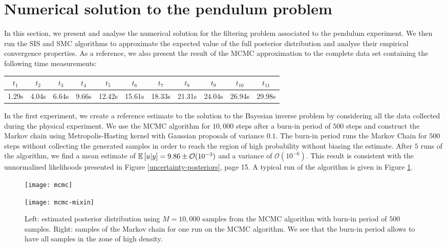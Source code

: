 \section{Numerical solution to the pendulum problem}
In this section, we present and analyse the numerical solution for the filtering problem associated to the pendulum experiment. We then run the SIS and SMC algorithms to approximate the expected value of the full posterior distribution and analyse their empirical convergence properties. As a reference, we also present the result of the MCMC approximation to the complete data set containing the following time measurements:

\begin{table}[h]
  \begin{center}
    \begin{tabular}{|c c c c c c c c c c c|}
      \hline $t_1$ & $t_2$ & $t_3$ & $t_4$ & $t_5$ & $t_6$ & $t_7$ & $t_8$ & $t_9$ & $t_{10}$ & $t_{11}$ \\
      \hline
      1.29s & 4.04s & 6.64s & 9.66s & 12.42s & 15.61s & 18.33s & 21.31s & 24.04s & 26.94s & 29.98s \\
      \hline
    \end{tabular}
  \end{center}
\end{table}

In the first experiment, we create a reference estimate to the solution to the Bayesian inverse problem by considering all the data collected during the physical experiment. We use the MCMC algorithm for $10,000$ steps after a burn-in period of $500$ steps and construct the Markov chain using Metropolis-Hasting kernel with Gaussian proposals of variance $0.1$. The burn-in period runs the Markov Chain for $500$ steps without collecting the generated samples in order to reach the region of high probability without biasing the estimate. After $5$ runs of the algorithm, we find a mean estimate of $\mathbb{E}\left[u|y\right] = 9.86 \pm \mathcal{O}(10^{-3})$ and a variance of $\mathcal{O}(10^{-6})$. This result is consistent with the unnormalized likelihoods presented in Figure \ref{uncertainty-posteriors}, page 15. A typical run of the algorithm is given in Figure \ref{mcmc-figure}.

\begin{figure}[!t]
  \begin{minipage}{.43\textwidth}
    \texttt{[image: mcmc]}
  \end{minipage}
  \begin{minipage}{.5\textwidth}
    \texttt{[image: mcmc-mixin]}
  \end{minipage}
  \caption{Left: estimated posterior distribution using $M=10,000$ samples from the MCMC algorithm with burn-in period of $500$ samples. Right: samples of the Markov chain for one run on the MCMC algorithm. We see that the burn-in period allows to have all samples in the zone of high density.}
  \label{mcmc-figure}
\end{figure}

